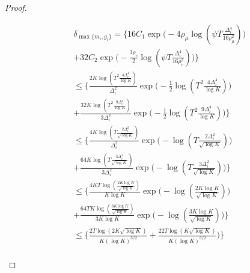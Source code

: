 \begin{proof}
\begin{small}
\begin{align*}
& \delta_{\max\lbrace m_{i}, g_{i}\rbrace}= \bigg\lbrace 16 C_1\exp\bigg(-4\rho_{\mu}\log (\psi T\frac{\Delta_{i}^{4}}{16\rho_{\mu}^{2}})\bigg)\\
& + 32C_2\exp\bigg(- \frac{3\rho_v}{2} \log(\psi T\frac{\Delta_{i}^{4}}{16\rho_{v}^{2}}) \bigg) \bigg\rbrace\\
&\leq \bigg\lbrace  \frac{2K\log ( T^2 \frac{4\Delta_{i}^{4}}{\log K})}{\Delta_{i}^{2}}\exp\bigg(-\frac{1}{2}\log ( T^2\frac{4\Delta_{i}^{4}}{\log K})\bigg)\\
& + \frac{32K\log ( T^2 \frac{9\Delta_{i}^{4}}{\log K})}{3\Delta_{i}^{2}}\exp\bigg(- \frac{1}{2} \log( T^2 \frac{9\Delta_{i}^{4}}{\log K}) \bigg) \bigg\rbrace\\
&\leq \bigg\lbrace  \frac{4K\log ( T \frac{2\Delta_{i}^{2}}{\sqrt{\log K}})}{\Delta_{i}^{2}}\exp\bigg(-\log ( T\frac{2\Delta_{i}^{2}}{\sqrt{\log K}})\bigg)\\
& + \frac{64K\log ( T \frac{3\Delta_{i}^{2}}{\sqrt{\log K}})}{3\Delta_{i}^{2}}\exp\bigg(- \log( T \frac{3\Delta_{i}^{2}}{\sqrt{\log K}}) \bigg) \bigg\rbrace\\
&\leq \bigg\lbrace  \frac{4KT\log ( \frac{2 K\log K}{\sqrt{\log K}})}{K\log K}\exp\bigg(-\log ( \frac{2K\log K}{\sqrt{\log K}})\bigg)\\
& + \frac{64TK\log (\frac{3 K\log K}{\sqrt{\log K}})}{3 K\log K}\exp\bigg(- \log( \frac{3 K\log K}{\sqrt{\log K}}) \bigg) \bigg\rbrace\\
&\leq \bigg\lbrace  \frac{2T\log (2 K\sqrt{\log K})}{K (\log K)^{3/2}}
 + \frac{22T\log ( K\sqrt{\log K})}{ K(\log K)^{3/2}}\bigg) \bigg\rbrace\\
\end{align*}
\end{small}


\end{proof}
